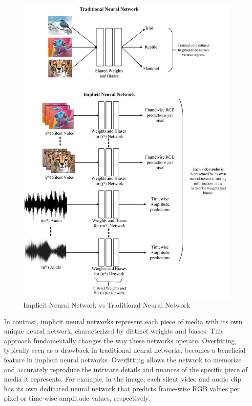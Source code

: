 \documentclass{ioereport}
\begin{document}
    \begin{figure}[H]
        \centering
        \includegraphics[width=0.95\linewidth]{assets/why overfitting.png}
        \caption{Implicit Neural Network vs Traditional Neural Network}
        \label{fig:implicit-vs-traditional}
    \end{figure}

    In contrast, implicit neural networks represent each piece of media with its own unique neural network, characterized by distinct weights and biases. This approach fundamentally changes the way these networks operate. Overfitting, typically seen as a drawback in traditional neural networks, becomes a beneficial feature in implicit neural networks. Overfitting allows the network to memorize and accurately reproduce the intricate details and nuances of the specific piece of media it represents. For example, in the image, each silent video and audio clip has its own dedicated neural network that predicts frame-wise RGB values per pixel or time-wise amplitude values, respectively.
\end{document}
